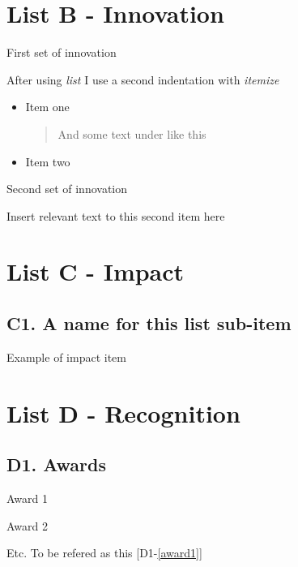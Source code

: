 \documentclass[11pt,letterpaper,roman]{article}
\newcounter{qcounter}
\begin{document}
\section*{List B - Innovation}

\begin{list}{B:~}{}
\item \label{innov1} First set of innovation

 After using \emph{list} I use a second indentation with \emph{itemize}

  \begin{itemize}

  \item[] Item one

    \begin{quote} 
      And some text under like this
    \end{quote}
  
  \item[] Item two

  \end{itemize}


\item \label{innov2} Second set of innovation

Insert relevant text to this second item here

\end{list}


\section*{List C - Impact}
\subsection*{C1. A name for this list sub-item }

\begin{list}{C1-:~}{}

\item \label{impact1} Example of impact item

\end{list}


\section*{List D - Recognition}

\subsection*{D1. Awards}
\begin{list}{D1.:~}{}
\item \label{award1} Award 1
\item \label{award2} Award 2
\item \label{award3} Etc. To be refered as this [D1-\ref{award1}]
\end{list}
\end{document}
